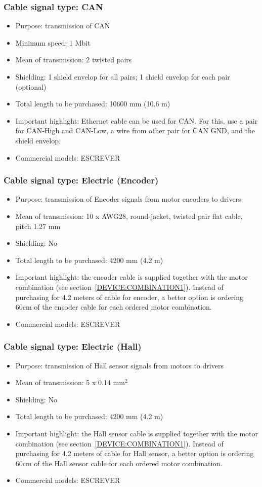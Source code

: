 \subsubsection{Cable signal type: CAN} \label{CABLETYPE:CAN}
\begin{itemize}
  \item Purpose: transmission of CAN
  \item Minimum speed: 1 Mbit
  \item Mean of transmission: 2 twisted pairs
  \item Shielding: 1 shield envelop for all pairs; 1 shield envelop for each pair (optional)
  \item Total length to be purchased: 10600 mm (10.6 m)
  \item Important highlight: Ethernet cable can be used for CAN. For this, use a pair for CAN-High and CAN-Low, a wire from other pair for CAN GND, and the shield envelop.
  \item Commercial models: ESCREVER
\end{itemize}
\subsubsection{Cable signal type: Electric (Encoder)} \label{CABLETYPE:Electric(Encoder)}
\begin{itemize}
  \item Purpose: transmission of Encoder signals from motor encoders to drivers
  \item Mean of transmission: 10 x AWG28, round-jacket, twisted pair flat cable, pitch 1.27 mm
  \item Shielding: No
  \item Total length to be purchased: 4200 mm (4.2 m)
  \item Important highlight: the encoder cable is supplied together with the motor combination (see section~\ref{DEVICE:COMBINATION1}). Instead of purchasing for 4.2 meters of cable for encoder, a better option is ordering 60cm of the encoder cable for each ordered motor combination.
  \item Commercial models: ESCREVER
\end{itemize}
\subsubsection{Cable signal type: Electric (Hall)} \label{CABLETYPE:Electric(Hall)}
\begin{itemize}
  \item Purpose: transmission of Hall sensor signals from motors to drivers
  \item Mean of transmission: 5 x 0.14 mm$^{2}$
  \item Shielding: No
  \item Total length to be purchased: 4200 mm (4.2 m)
  \item Important highlight: the Hall sensor cable is supplied together with the motor combination (see section~\ref{DEVICE:COMBINATION1}). Instead of purchasing for 4.2 meters of cable for Hall sensor, a better option is ordering 60cm of the Hall sensor cable for each ordered motor combination.
  \item Commercial models: ESCREVER
\end{itemize}
